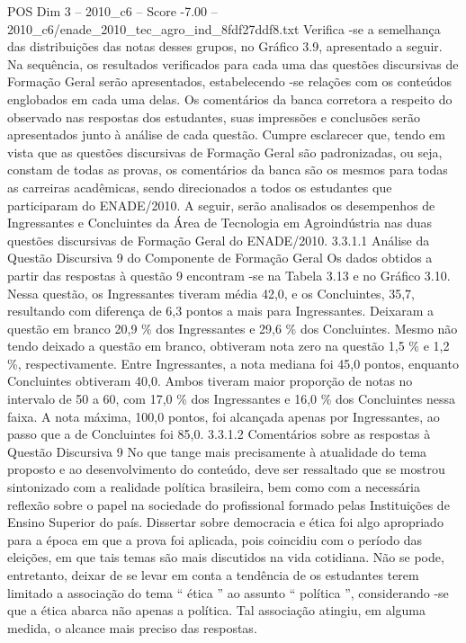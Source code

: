 \begin{textsample}{POS Dim 3 – 2010\_c6 – Score -7.00 – 2010\_c6/enade\_2010\_tec\_agro\_ind\_8fdf27ddf8.txt}
Verifica -se a semelhança das distribuições das notas desses grupos, no Gráfico 3.9, apresentado a seguir.
Na sequência, os resultados verificados para cada uma das questões discursivas de Formação Geral serão apresentados, estabelecendo -se relações com os conteúdos englobados em cada uma delas.
Os comentários da banca corretora a respeito do observado nas respostas dos estudantes, suas impressões e conclusões serão apresentados junto à análise de cada questão.
Cumpre esclarecer que, tendo em vista que as questões discursivas de Formação Geral são padronizadas, ou seja, constam de todas as provas, os comentários da banca são os mesmos para todas as carreiras acadêmicas, sendo direcionados a todos os estudantes que participaram do ENADE/2010.
A seguir, serão analisados os desempenhos de Ingressantes e Concluintes da Área de Tecnologia em Agroindústria nas duas questões discursivas de Formação Geral do ENADE/2010. 3.3.1.1 Análise da Questão Discursiva 9 do Componente de Formação Geral Os dados obtidos a partir das respostas à questão 9 encontram -se na Tabela 3.13 e no Gráfico 3.10.
Nessa questão, os Ingressantes tiveram média 42,0, e os Concluintes, 35,7, resultando com diferença de 6,3 pontos a mais para Ingressantes.
Deixaram a questão em branco 20,9 \% dos Ingressantes e 29,6 \% dos Concluintes.
Mesmo não tendo deixado a questão em branco, obtiveram nota zero na questão 1,5 \% e 1,2 \%, respectivamente.
Entre Ingressantes, a nota mediana foi 45,0 pontos, enquanto Concluintes obtiveram 40,0.
Ambos tiveram maior proporção de notas no intervalo de 50 a 60, com 17,0 \% dos Ingressantes e 16,0 \% dos Concluintes nessa faixa.
A nota máxima, 100,0 pontos, foi alcançada apenas por Ingressantes, ao passo que a de Concluintes foi 85,0. 3.3.1.2 Comentários sobre as respostas à Questão Discursiva 9 No que tange mais precisamente à atualidade do tema proposto e ao desenvolvimento do conteúdo, deve ser ressaltado que se mostrou sintonizado com a realidade política brasileira, bem como com a necessária reflexão sobre o papel na sociedade do profissional formado pelas Instituições de Ensino Superior do país.
Dissertar sobre democracia e ética foi algo apropriado para a época em que a prova foi aplicada, pois coincidiu com o período das eleições, em que tais temas são mais discutidos na vida cotidiana.
Não se pode, entretanto, deixar de se levar em conta a tendência de os estudantes terem limitado a associação do tema “ ética ” ao assunto “ política ”, considerando -se que a ética abarca não apenas a política.
Tal associação atingiu, em alguma medida, o alcance mais preciso das respostas.

\end{textsample}
